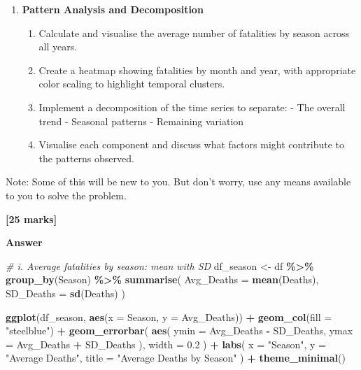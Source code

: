 \documentclass[
  10t,
]{article}
\newenvironment{Shaded}{\begin{snugshade}}{\end{snugshade}}
\newcommand{\AttributeTok}[1]{\textcolor[rgb]{0.13,0.29,0.53}{#1}}
\newcommand{\CommentTok}[1]{\textcolor[rgb]{0.56,0.35,0.01}{\textit{#1}}}
\newcommand{\FloatTok}[1]{\textcolor[rgb]{0.00,0.00,0.81}{#1}}
\newcommand{\FunctionTok}[1]{\textcolor[rgb]{0.13,0.29,0.53}{\textbf{#1}}}
\newcommand{\NormalTok}[1]{#1}
\newcommand{\OtherTok}[1]{\textcolor[rgb]{0.56,0.35,0.01}{#1}}
\newcommand{\SpecialCharTok}[1]{\textcolor[rgb]{0.81,0.36,0.00}{\textbf{#1}}}
\newcommand{\StringTok}[1]{\textcolor[rgb]{0.31,0.60,0.02}{#1}}
\providecommand{\tightlist}{%
  \setlength{\itemsep}{0pt}\setlength{\parskip}{0pt}}
\begin{document}
\begin{enumerate}
\def\labelenumi{\alph{enumi}.}
\setcounter{enumi}{2}
\tightlist
\item
  \textbf{Pattern Analysis and Decomposition}

  \begin{enumerate}
  \def\labelenumii{\roman{enumii}.}
  \tightlist
  \item
    Calculate and visualise the average number of fatalities by season
    across all years.
  \item
    Create a heatmap showing fatalities by month and year, with
    appropriate color scaling to highlight temporal clusters.
  \item
    Implement a decomposition of the time series to separate: - The
    overall trend - Seasonal patterns - Remaining variation
  \item
    Visualise each component and discuss what factors might contribute
    to the patterns observed.
  \end{enumerate}
\end{enumerate}

Note: Some of this will be new to you. But don't worry, use any means
available to you to solve the problem.

\textbf{{[}25 marks{]}}

\textbf{Answer}

\begin{Shaded}
\begin{Highlighting}[]
\CommentTok{\# i. Average fatalities by season: mean with SD}
\NormalTok{df\_season }\OtherTok{\textless{}{-}}\NormalTok{ df }\SpecialCharTok{\%\textgreater{}\%}
  \FunctionTok{group\_by}\NormalTok{(Season) }\SpecialCharTok{\%\textgreater{}\%}
  \FunctionTok{summarise}\NormalTok{(}
    \AttributeTok{Avg\_Deaths =} \FunctionTok{mean}\NormalTok{(Deaths),}
    \AttributeTok{SD\_Deaths  =} \FunctionTok{sd}\NormalTok{(Deaths)}
\NormalTok{  )}

\FunctionTok{ggplot}\NormalTok{(df\_season, }\FunctionTok{aes}\NormalTok{(}\AttributeTok{x =}\NormalTok{ Season, }\AttributeTok{y =}\NormalTok{ Avg\_Deaths)) }\SpecialCharTok{+}
  \FunctionTok{geom\_col}\NormalTok{(}\AttributeTok{fill =} \StringTok{"steelblue"}\NormalTok{) }\SpecialCharTok{+}
  \FunctionTok{geom\_errorbar}\NormalTok{(}
    \FunctionTok{aes}\NormalTok{(}
      \AttributeTok{ymin =}\NormalTok{ Avg\_Deaths }\SpecialCharTok{{-}}\NormalTok{ SD\_Deaths,}
      \AttributeTok{ymax =}\NormalTok{ Avg\_Deaths }\SpecialCharTok{+}\NormalTok{ SD\_Deaths}
\NormalTok{    ),}
    \AttributeTok{width =} \FloatTok{0.2}
\NormalTok{  ) }\SpecialCharTok{+}
  \FunctionTok{labs}\NormalTok{(}
    \AttributeTok{x =} \StringTok{"Season"}\NormalTok{,}
    \AttributeTok{y =} \StringTok{"Average Deaths"}\NormalTok{,}
    \AttributeTok{title =} \StringTok{"Average Deaths by Season"}
\NormalTok{  ) }\SpecialCharTok{+}
  \FunctionTok{theme\_minimal}\NormalTok{()}
\end{Highlighting}
\end{Shaded}
\end{document}
